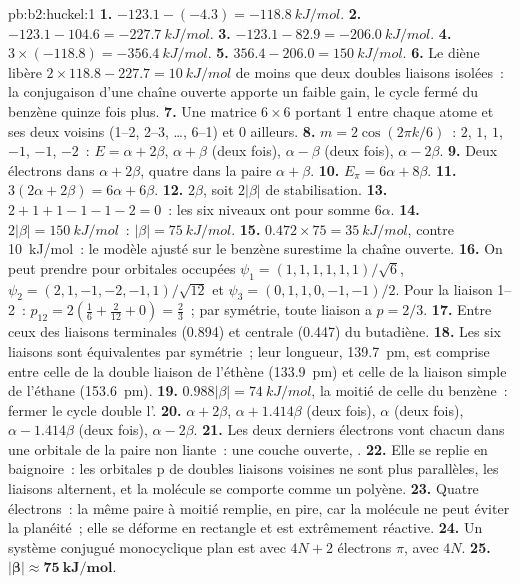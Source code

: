 \begin{solution}{pb:b2:huckel:1}
\textbf{1.} $-123.1 - (-4.3) = \qty{-118.8}{kJ/mol}$.
\textbf{2.} $-123.1 - 104.6 = \qty{-227.7}{kJ/mol}$.
\textbf{3.} $-123.1 - 82.9 = \qty{-206.0}{kJ/mol}$.
\textbf{4.} $3 \times (-118.8) = \qty{-356.4}{kJ/mol}$.
\textbf{5.} $356.4 - 206.0 = \qty{150}{kJ/mol}$.
\textbf{6.} Le diène libère $2 \times 118.8 - 227.7 = \qty{10}{kJ/mol}$ de moins que deux
doubles liaisons isolées~: la conjugaison d'une chaîne ouverte apporte un faible gain, le cycle
fermé du benzène quinze fois plus.
\textbf{7.} Une matrice $6 \times 6$ portant 1 entre chaque atome et ses deux voisins (1--2, 2--3,
\dots, 6--1) et 0 ailleurs.
\textbf{8.} $m = 2\cos(2\pi k/6)$~: $2$, $1$, $1$, $-1$, $-1$, $-2$~: $E = \alpha + 2\beta$, $\alpha + \beta$ (deux fois),
$\alpha - \beta$ (deux fois), $\alpha - 2\beta$.
\textbf{9.} Deux électrons dans $\alpha + 2\beta$, quatre dans la paire $\alpha + \beta$.
\textbf{10.} $E_\pi = 6\alpha + 8\beta$.
\textbf{11.} $3(2\alpha + 2\beta) = 6\alpha + 6\beta$.
\textbf{12.} $2\beta$, soit $2|\beta|$ de stabilisation.
\textbf{13.} $2 + 1 + 1 - 1 - 1 - 2 = 0$~: les six niveaux ont pour somme $6\alpha$.
\textbf{14.} $2|\beta| = \qty{150}{kJ/mol}$~: $|\beta| = \qty{75}{kJ/mol}$.
\textbf{15.} $0.472 \times 75 = \qty{35}{kJ/mol}$, contre \qty{10}{kJ/mol}~: le modèle ajusté
sur le benzène surestime la chaîne ouverte.
\textbf{16.} On peut prendre pour orbitales occupées $\psi_1 = (1, 1, 1, 1, 1, 1)/\sqrt6$,
$\psi_2 = (2, 1, -1, -2, -1, 1)/\sqrt{12}$ et $\psi_3 = (0, 1, 1, 0, -1, -1)/2$. Pour la liaison
1--2~: $p_{12} = 2(\frac16 + \frac{2}{12} + 0) = \frac23$~; par symétrie, toute liaison a $p = 2/3$.
\textbf{17.} Entre ceux des liaisons terminales (0.894) et centrale (0.447) du butadiène.
\textbf{18.} Les six liaisons sont équivalentes par symétrie~; leur longueur, \qty{139.7}{pm}, est comprise
entre celle de la double liaison de l'éthène (\qty{133.9}{pm}) et celle de la liaison simple de l'éthane
(\qty{153.6}{pm}).
\textbf{19.} $0.988|\beta| = \qty{74}{kJ/mol}$, la moitié de celle du benzène~: fermer le cycle double
l'.
\textbf{20.} $\alpha + 2\beta$, $\alpha + 1.414\beta$ (deux fois), $\alpha$ (deux fois), $\alpha - 1.414\beta$ (deux fois),
$\alpha - 2\beta$.
\textbf{21.} Les deux derniers électrons vont chacun dans une orbitale de la paire non liante~: une couche
ouverte, .
\textbf{22.} Elle se replie en baignoire~: les orbitales p de doubles liaisons voisines ne sont plus
parallèles, les liaisons alternent, et la molécule se comporte comme un polyène.
\textbf{23.} Quatre électrons~: la même paire à moitié remplie, en pire, car la molécule ne peut
éviter la planéité~; elle se déforme en rectangle et est extrêmement réactive.
\textbf{24.} Un système conjugué monocyclique plan est  avec $4N + 2$ électrons $\pi$,
 avec $4N$.
\textbf{25.} $\boldsymbol{|\beta| \approx \qty{75}{kJ/mol}}$.
\end{solution}
